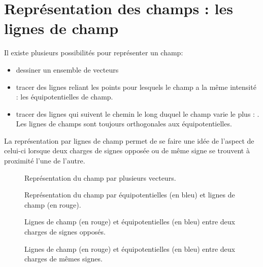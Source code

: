 \newpage

\section{Représentation des champs : les lignes de champ}
Il existe plusieurs possibilités pour représenter un champ:
\begin{itemize}[label=\textbullet]
    \item dessiner un ensemble de vecteurs
    \item tracer des lignes reliant les points pour lesquels le champ a la même intensité : les équipotentielles de champ.
    \item tracer des lignes qui suivent le chemin le long duquel le champ varie le plus : . Les lignes de champs sont toujours orthogonales aux équipotentielles.
\end{itemize}
La représentation par lignes de champ permet de se faire une idée de l'aspect de celui-ci lorsque deux charges de signes opposée ou de même signe se trouvent à proximité l'une de l'autre.

\newpage

\begin{figure}[h!]
    \centering
    \resizebox{.6\linewidth}{!}{}
    \caption{Représentation du champ par plusieurs vecteurs.}
    \label{vecteurs_champ}
\end{figure}

\begin{figure}[h!]
    \centering
    \resizebox{.6\linewidth}{!}{}
    \caption{Représentation du champ par équipotentielles (en bleu) et lignes de champ (en rouge).}
    \label{equipotentielle}
\end{figure}

\newpage

\begin{figure}[!ht]
    \centering
    \begin{minipage}[b]{.4\linewidth}
        \centering
        \resizebox{.9\linewidth}{!}{}
        \caption{Lignes de champ (en rouge) et équipotentielles (en bleu) entre deux charges de signes opposés.}
        \label{champ_pos_neg}
    \end{minipage}
    \begin{minipage}[b]{.4\linewidth}
        \centering
        \resizebox{.9\linewidth}{!}{}
        \caption{Lignes de champ (en rouge) et équipotentielles (en bleu) entre deux charges de mêmes signes.}
        \label{champ_pos_pos}
    \end{minipage}
\end{figure}



